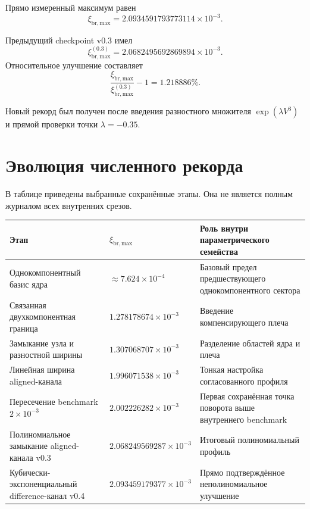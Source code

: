 \documentclass[11pt,a4paper]{article}
\newcommand{\xibr}{\xi_{\mathrm{br,max}}}
\newcommand{\vac}{V}
\begin{document}
Прямо измеренный максимум равен
\begin{equation}
\boxed{\xibr=2.0934591793773114\times10^{-3}}.
\label{eq:retained_fold}
\end{equation}

Предыдущий checkpoint v0.3 имел
\begin{equation}
\xibr^{(0.3)}=2.0682495692869894\times10^{-3}.
\end{equation}
Относительное улучшение составляет
\begin{equation}
\frac{\xibr}{\xibr^{(0.3)}}-1
=1.218886\%.
\end{equation}

Новый рекорд был получен после введения разностного множителя $\exp(\lambda\vac^3)$ и прямой проверки точки $\lambda=-0.35$.

\section{Эволюция численного рекорда}

В таблице приведены выбранные сохранённые этапы. Она не является полным журналом всех внутренних срезов.

\begin{center}
\small
\begin{tabular}{@{}p{}p{}p{}@{}}
\textbf{Этап} & \textbf{$\xibr$} & \textbf{Роль внутри параметрического семейства} \\
\hline
Однокомпонентный базис ядра & $\approx7.624\times10^{-4}$ & Базовый предел предшествующего однокомпонентного сектора \\
Связанная двухкомпонентная граница & $1.278178674\times10^{-3}$ & Введение компенсирующего плеча \\
Замыкание узла и разностной ширины & $1.307068707\times10^{-3}$ & Разделение областей ядра и плеча \\
Линейная ширина aligned-канала & $1.996071538\times10^{-3}$ & Тонкая настройка согласованного профиля \\
Пересечение benchmark $2\times10^{-3}$ & $2.002226282\times10^{-3}$ & Первая сохранённая точка поворота выше внутреннего benchmark \\
Полиномиальное замыкание aligned-канала v0.3 & $2.068249569287\times10^{-3}$ & Итоговый полиномиальный профиль \\
Кубически-экспоненциальный difference-канал v0.4 & $2.093459179377\times10^{-3}$ & Прямо подтверждённое неполиномиальное улучшение \\
\end{tabular}
\end{center}
\end{document}
